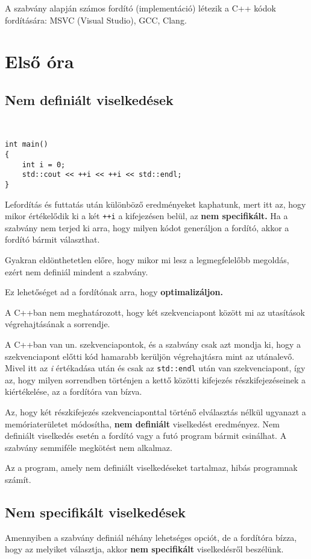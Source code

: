 \documentclass[a4paper,11.5pt]{article}
\begin{document}
	\medskip
  A szabvány alapján számos fordító (implementáció) létezik a C++ kódok fordítására: MSVC (Visual Studio), GCC, Clang. 
	\section{Első óra}
	\subsection{Nem definiált viselkedések}
	\begin{example}\ 
		
		\begin{lstlisting}
int main()
{
	int i = 0;
	std::cout << ++i << ++i << std::endl;
}
		\end{lstlisting}
		
		Lefordítás és futtatás után különböző eredményeket kaphatunk, mert itt az, hogy mikor értékelődik ki a két \texttt{++i} a kifejezésen belül, az \textbf{nem specifikált.} Ha a szabvány nem terjed ki arra, hogy milyen kódot generáljon a fordító, akkor a fordító bármit választhat. 
		
		\medskip
		Gyakran eldönthetetlen előre, hogy mikor mi lesz a legmegfelelőbb megoldás, ezért nem definiál mindent a szabvány.
		
		\medskip
		Ez lehetőséget ad a fordítónak arra, hogy \textbf{optimalizáljon.} 
	\end{example}
	
	A C++ban nem meghatározott, hogy két szekvenciapont között mi az utasítások végrehajtásának a sorrendje.
	
	\medskip
	A C++ban van un. szekvenciapontok, és a szabvány csak azt mondja ki, hogy a szekvenciapont előtti kód hamarabb kerüljön végrehajtásra mint az utánalevő.  Mivel itt az \textit{i} értékadása után és csak az \texttt{std::endl} után van szekvenciapont, így az, hogy milyen sorrendben történjen a kettő közötti kifejezés részkifejezéseinek a kiértékelése, az a fordítóra van bízva.
	
	\medskip
	Az, hogy két részkifejezés szekvenciaponttal történő elválasztás nélkül ugyanazt a memóriaterületet módosítha, \textbf{nem definiált} viselkedést eredményez. Nem definiált viselkedés esetén a fordító vagy a futó program bármit csinálhat. A szabvány semmiféle megkötést nem alkalmaz.
	\begin{note}
		Az a program, amely nem definiált viselkedéseket tartalmaz, hibás programnak számít.
	\end{note}
	\subsection{Nem specifikált viselkedések}
	Amennyiben a szabvány definiál néhány lehetséges opciót, de a fordítóra bízza, hogy az melyiket választja, akkor \textbf{nem specifikált} viselkedésről beszélünk.
	
\end{document}
